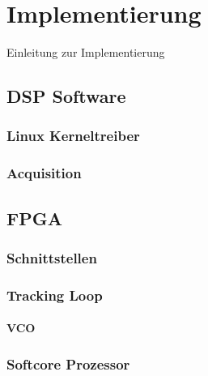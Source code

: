 \chapter{Implementierung}
Einleitung zur Implementierung

\section{DSP Software}

\subsection{Linux Kerneltreiber}\label{Kerneltreiber}


\subsection{Acquisition}

\section{FPGA}
\subsection{Schnittstellen}

\subsection{Tracking Loop}
\label{ImplMemoryMapTrackingloop}
\subsubsection{VCO}\label{VCOimplementierung}

\subsection{Softcore Prozessor}

